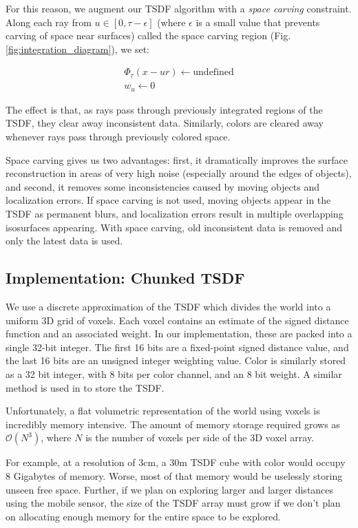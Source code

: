 \documentclass[10pt,twocolumn,letterpaper]{article}
\begin{document}
For this reason, we augment our TSDF algorithm with a \textit{space carving}
constraint. Along each ray from $u \in [0, \tau - \epsilon]$ (where $\epsilon$
is a small value that prevents carving of space near surfaces) called the space
carving region (Fig. \ref{fig:integration_diagram}), we set:

\begin{align}
\Phi_{\tau}(x - ur) \gets \text{undefined}
\\
%
w_u \gets 0
\end{align}

\noindent  The effect is that, as rays pass through previously integrated
regions of the TSDF, they clear away inconsistent data. Similarly, colors are
cleared away whenever rays pass through previously colored space.

Space carving gives us two advantages: first, it dramatically improves the
surface reconstruction in areas of very high noise (especially around the edges
of objects), and second, it removes some inconsistencies caused by moving
objects and localization errors. If space carving is not used, moving objects
appear in the TSDF as permanent blurs, and localization errors result in
multiple overlapping isosurfaces appearing. With space carving, old inconsistent
data is removed and only the latest data is used.

\subsection{Implementation: Chunked TSDF}
We use a discrete approximation of the TSDF which divides the world into
a uniform 3D grid of voxels. Each voxel contains an estimate of the signed
distance function and an associated weight. In our implementation, these are
packed into a single 32-bit integer. The first 16 bits are a fixed-point
signed distance value, and the last 16 bits  are an unsigned integer weighting
value. Color is similarly stored as a 32 bit integer, with 8 bits per color
channel, and an 8 bit weight. A similar method is used in \cite{Newcombe,
Whelan2013, Bylow2013} to store the TSDF.

Unfortunately, a flat volumetric representation of the world using voxels is
incredibly memory intensive. The amount of memory storage required grows as
$\mathcal{O}(N^3)$, where $N$ is the number of voxels per side of the 3D voxel
array.

For example, at a resolution of $3\text{cm}$,  a $30\text{m}$ TSDF cube with
color would occupy 8 Gigabytes of memory. Worse, most of that memory would be
uselessly storing unseen free space. Further, if we plan on exploring larger and larger
distances using the mobile sensor, the size of the TSDF array must grow if we
don't plan on allocating enough memory for the entire space to be explored.
\end{document}
